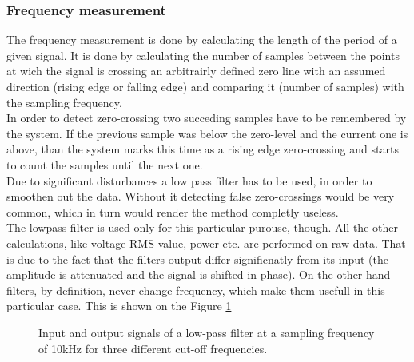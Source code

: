 \subsubsection{Frequency measurement}
The frequency measurement is done by calculating the length of the period of a given signal. It is done by calculating the number of samples between the points at wich the signal is crossing an arbitrairly defined zero line with an assumed direction (rising edge or falling edge) and comparing it (number of samples) with the sampling frequency.\\
In order to detect zero-crossing two succeding samples have to be remembered by the system. If the previous sample was below the zero-level and the current one is above, than the system marks this time as a rising edge zero-crossing and starts to count the samples until the next one.\\
Due to significant disturbances a low pass filter has to be used, in order to smoothen out the data. Without it detecting false zero-crossings would be very common, which in turn would render the method completly useless.\\
The lowpass filter is used only for this particular purouse, though. All the other calculations, like voltage RMS value, power etc. are performed on raw data. That is due to the fact that the filters output differ significnatly from its input (the amplitude is attenuated and the signal is shifted in phase). On the other hand filters, by definition, never change frequency, which make them usefull in this particular case. This is shown on the Figure \ref{fig:filter}


\begin{figure}[!h]
  \centering
         
  \caption{Input and output signals of a low-pass filter at a sampling frequency of 10kHz for three different cut-off frequencies.}
  \label{fig:filter}
\end{figure}


